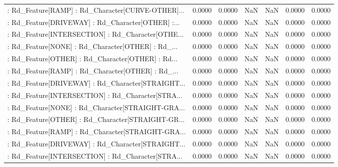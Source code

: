 \begin{longtable}{p{4cm}cccccc}
 : Rd\_Feature[RAMP] : Rd\_Character[CURVE-OTHER]... &            0.0000 &            0.0000 &     NaN &          NaN &             0.0000 &            0.0000 \\
 : Rd\_Feature[DRIVEWAY] : Rd\_Character[OTHER] :... &            0.0000 &            0.0000 &     NaN &          NaN &             0.0000 &            0.0000 \\
 : Rd\_Feature[INTERSECTION] : Rd\_Character[OTHE... &            0.0000 &            0.0000 &     NaN &          NaN &             0.0000 &            0.0000 \\
 : Rd\_Feature[NONE] : Rd\_Character[OTHER] : Rd\_... &            0.0000 &            0.0000 &     NaN &          NaN &             0.0000 &            0.0000 \\
 : Rd\_Feature[OTHER] : Rd\_Character[OTHER] : Rd... &            0.0000 &            0.0000 &     NaN &          NaN &             0.0000 &            0.0000 \\
 : Rd\_Feature[RAMP] : Rd\_Character[OTHER] : Rd\_... &            0.0000 &            0.0000 &     NaN &          NaN &             0.0000 &            0.0000 \\
 : Rd\_Feature[DRIVEWAY] : Rd\_Character[STRAIGHT... &            0.0000 &            0.0000 &     NaN &          NaN &             0.0000 &            0.0000 \\
 : Rd\_Feature[INTERSECTION] : Rd\_Character[STRA... &            0.0000 &            0.0000 &     NaN &          NaN &             0.0000 &            0.0000 \\
 : Rd\_Feature[NONE] : Rd\_Character[STRAIGHT-GRA... &            0.0000 &            0.0000 &     NaN &          NaN &             0.0000 &            0.0000 \\
 : Rd\_Feature[OTHER] : Rd\_Character[STRAIGHT-GR... &            0.0000 &            0.0000 &     NaN &          NaN &             0.0000 &            0.0000 \\
 : Rd\_Feature[RAMP] : Rd\_Character[STRAIGHT-GRA... &            0.0000 &            0.0000 &     NaN &          NaN &             0.0000 &            0.0000 \\
 : Rd\_Feature[DRIVEWAY] : Rd\_Character[STRAIGHT... &            0.0000 &            0.0000 &     NaN &          NaN &             0.0000 &            0.0000 \\
 : Rd\_Feature[INTERSECTION] : Rd\_Character[STRA... &            0.0000 &            0.0000 &     NaN &          NaN &             0.0000 &            0.0000 \\

\end{longtable}
